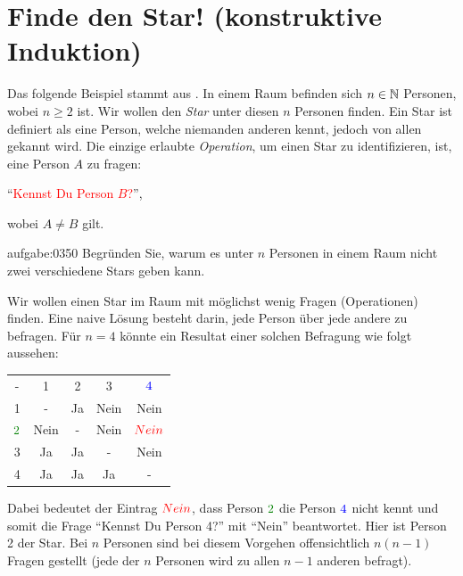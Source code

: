 \section{Finde den Star! (konstruktive Induktion)}
Das folgende Beispiel stammt aus \cite{Datenstrukturen}. In einem Raum befinden sich $n\in\mathbb{N}$ Personen, wobei $n\geq 2$ ist. Wir wollen den \textit{Star} unter diesen $n$ Personen finden. Ein Star ist definiert als eine Person, welche niemanden anderen kennt, jedoch von allen gekannt wird. Die einzige erlaubte \textit{Operation}, um einen Star zu identifizieren, ist, eine Person $A$ zu fragen:
\begin{center}
    \enquote{\textcolor{Red}{Kennst Du Person $B$?}},
\end{center}
wobei $A\neq B$ gilt.

\begin{aufgabe}{aufgabe:0350}
    Begründen Sie, warum es unter $n$ Personen in einem Raum nicht zwei verschiedene Stars geben kann.
\end{aufgabe}
\noindent
Wir wollen einen Star im Raum mit möglichst wenig Fragen (Operationen) finden. Eine naive Lösung besteht darin, jede Person über jede andere zu befragen. Für $n=4$ könnte ein Resultat einer solchen Befragung wie folgt aussehen:
\begin{table}[H]
\centering
    \begin{tabular}{ccccc}
    -                                        & 1    & 2  & 3    & $\textcolor{Blue}{4}$   \\
    1                                       & -    & Ja & Nein & Nein                                     \\
    $\textcolor{Green}{2}$ & Nein & -  & Nein & $\textcolor{Red}{Nein}$ \\
    3                                       & Ja   & Ja & -    & Nein                                     \\
    4                                       & Ja   & Ja & Ja   & -                                       
    \end{tabular}
\end{table}
\noindent
Dabei bedeutet der Eintrag $\textcolor{Red}{Nein}$, dass Person $\textcolor{Green}{2}$ die Person $\textcolor{Blue}{4}$ nicht kennt und somit die Frage \enquote{Kennst Du Person 4?} mit \enquote{Nein} beantwortet. Hier ist Person 2 der Star. Bei $n$ Personen sind bei diesem Vorgehen offensichtlich $n(n-1)$ Fragen gestellt (jede der $n$ Personen wird zu allen $n-1$ anderen befragt).


